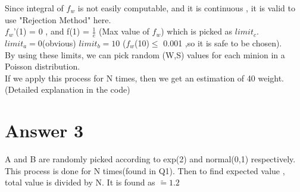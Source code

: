 \documentclass[12pt]{article}
\begin{document}
Since integral of $f_w$ is not easily computable, and it is continuous , it is valid to use "Rejection Method" here.\\
$f_w$'(1) = 0 , and f(1) = $\frac{1}{e}$ (Max value of $f_w$) which is picked as $limit_c$.\\
$limit_a = 0$(obvious) $limit_b = 10$ ($f_w$(10)$ \leq$ 0.001 ,so it is safe to be chosen).\\
By using these limits, we can pick random (W,S) values for each minion in a Poisson distribution.\\
If we apply this process for N times, then we get an estimation of 40 weight.(Detailed explanation in the code)\\




\section*{Answer 3}

A and B are randomly picked according to exp(2) and normal(0,1) respectively. This process is done for N times(found in Q1). Then to find expected
value , total value is divided by N. It is found as $ \widetilde{=} 1.2 $ 
\end{document}
